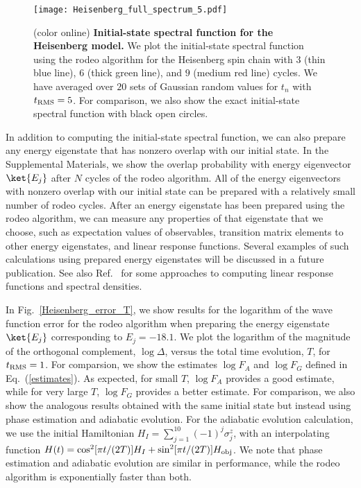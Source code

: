 \begin{figure}
\centering
\texttt{[image: Heisenberg\_full\_spectrum\_5.pdf]}
\caption{(color online) {\bf Initial-state spectral function for the Heisenberg model.} We plot the initial-state spectral function using the rodeo algorithm for the Heisenberg spin chain with $3$ (thin blue line), $6$ (thick green line), and $9$ (medium red line) cycles. We have averaged over $20$ sets of Gaussian random values for $t_n$ with $t_{\rm RMS}=5$.  For comparison, we also show the exact initial-state spectral function with black open circles.}
\label{Heisenberg_spectrum}
\end{figure} 
In addition to computing the initial-state spectral function, we can also prepare any energy eigenstate that has nonzero overlap with our initial state.  In the Supplemental Materials, we show the overlap probability with energy eigenvector $\ket{E_j}$ after $N$ cycles of the rodeo algorithm.  All of the energy eigenvectors with nonzero overlap with our initial state can be prepared with a relatively small number of rodeo cycles. After an energy eigenstate has been prepared using the rodeo algorithm, we can measure any properties of that eigenstate that we choose, such as expectation values of observables, transition matrix elements to other energy eigenstates, and linear response functions.  Several examples of such calculations using prepared energy eigenstates will be discussed in a future publication.  See also Ref.~\cite{Roggero:2018hrn,Roggero:2019myu,Roggero:2020qoz} for some approaches to computing linear response functions and spectral densities.

In Fig.~\ref{Heisenberg_error_T}, we show results for the logarithm of the wave function error for the rodeo algorithm when preparing the energy eigenstate $\ket{E_j}$ corresponding to $E_j = -18.1$.  We plot the logarithm of the magnitude of the orthogonal complement, $\log \Delta$, versus the total time evolution, $T$, for $t_{\rm RMS} = 1$.  For comparsion, we show the estimates $\log F_A$ and $\log F_G$ defined in Eq.~(\ref{estimates}).  As expected, for small $T$, $\log F_A$ provides a good estimate, while for very large $T$, $\log F_G$ provides a better estimate.  For comparison, we also show the analogous results obtained with the same initial state but instead using phase estimation and adiabatic evolution.  For the adiabatic evolution calculation, we use the initial Hamiltonian $H_I = \sum_{j=1}^{10} (-1)^j \sigma^z_j $,
with an interpolating function $H(t) = \cos^2[\pi t/(2T)]H_I + \sin^2[\pi t/(2T)]H_{\rm obj}$.  We note that phase estimation and adiabatic evolution are similar in performance, while the rodeo algorithm is exponentially faster than both.

